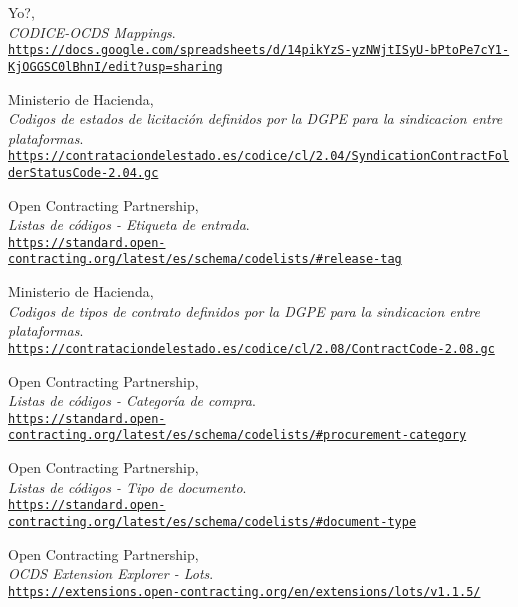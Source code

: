 \begin{thebibliography}{X}
            Yo?,
            \\ \textit{CODICE-OCDS Mappings}.
            \\ \texttt{\url{https://docs.google.com/spreadsheets/d/14pikYzS-yzNWjtISyU-bPtoPe7cY1-KjOGGSC0lBhnI/edit?usp=sharing}}
        
            Ministerio de Hacienda,
            \\ \textit{Codigos de estados de licitación definidos por la DGPE para la sindicacion entre plataformas}.
            \\ \texttt{\url{https://contrataciondelestado.es/codice/cl/2.04/SyndicationContractFolderStatusCode-2.04.gc}}
            
            Open Contracting Partnership,
            \\ \textit{Listas de códigos - Etiqueta de entrada}.
            \\ \texttt{\url{https://standard.open-contracting.org/latest/es/schema/codelists/\#release-tag}}
            
            Ministerio de Hacienda,
            \\ \textit{Codigos de tipos de contrato definidos por la DGPE para la sindicacion entre plataformas}.
            \\ \texttt{\url{https://contrataciondelestado.es/codice/cl/2.08/ContractCode-2.08.gc}}
            
            Open Contracting Partnership,
            \\ \textit{Listas de códigos - Categoría de compra}.
            \\ \texttt{\url{https://standard.open-contracting.org/latest/es/schema/codelists/\#procurement-category}}
            
            Open Contracting Partnership,
            \\ \textit{Listas de códigos - Tipo de documento}.
            \\ \texttt{\url{https://standard.open-contracting.org/latest/es/schema/codelists/\#document-type}}
            
            Open Contracting Partnership,
            \\ \textit{OCDS Extension Explorer - Lots}.
            \\ \texttt{\url{https://extensions.open-contracting.org/en/extensions/lots/v1.1.5/}}
            

\end{thebibliography}
